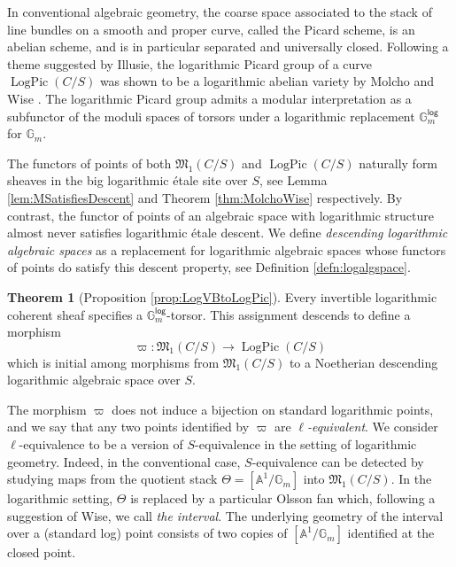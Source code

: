 \documentclass[11pt]{amsart}
\theoremstyle{definition}
\theoremstyle{definition}
\newtheorem{maintheorem}{Theorem}
\begin{document}
In conventional algebraic geometry, the coarse space associated to the stack of line bundles on a smooth and proper curve, called the Picard scheme, is an abelian scheme, and is in particular separated and universally closed. Following a theme suggested by Illusie, the logarithmic Picard group of a curve $\operatorname{LogPic}(C/S)$ was shown to be a logarithmic abelian variety \cite{KajiwaraKatoNakayama2008} by Molcho and Wise \cite{MolchoWise}. The logarithmic Picard group admits a modular interpretation as a subfunctor of the moduli spaces of torsors under a logarithmic replacement $\mathbb{G}_m^\mathsf{log}$ for $\mathbb{G}_m$. 

The functors of points of both $\mathfrak{M}_1(C/S)$ and $\operatorname{LogPic}(C/S)$ naturally form sheaves in the big logarithmic \'etale site over $S$, see Lemma \ref{lem:MSatisfiesDescent} and Theorem \ref{thm:MolchoWise} respectively. By contrast, the functor of points of an algebraic space with logarithmic structure almost never satisfies logarithmic \'etale descent. We define \textit{descending logarithmic algebraic spaces} as a replacement for logarithmic algebraic spaces whose functors of points do satisfy this descent property, see Definition \ref{defn:logalgspace}.

\begin{maintheorem}[Proposition \ref{prop:LogVBtoLogPic}]\label{mainthm:LogPic}
    Every invertible logarithmic coherent sheaf specifies a $\mathbb{G}_m^\mathsf{log}$-torsor. This assignment descends to define a morphism $$\varpi \colon \mathfrak{M}_1(C/S)\longrightarrow \operatorname{LogPic}(C/S)$$ which is initial among morphisms from $\mathfrak{M}_1(C/S)$ to a Noetherian descending logarithmic algebraic space over $S$.
\end{maintheorem}
The morphism $\varpi$ does not induce a bijection on standard logarithmic points, and we say that any two points identified by $\varpi$ are \textit{$\ell$-equivalent}. We consider $\ell$-equivalence to be a version of $S$-equivalence \cite{MumfordFogartyKirwan1994} in the setting of logarithmic geometry. Indeed, in the conventional case, $S$-equivalence can be detected by studying maps from the quotient stack $\Theta = [\mathbb{A}^1/\mathbb{G}_m]$ into $\mathfrak{M}_1(C/S)$. In the logarithmic setting, $\Theta$ is replaced by a particular Olsson fan \cite{VBOlssonFan} which, following a suggestion of Wise, we call \textit{the interval}. The underlying geometry of the interval over a (standard log) point consists of two copies of $[\mathbb{A}^1/\mathbb{G}_m]$ identified at the closed point.
\end{document}
